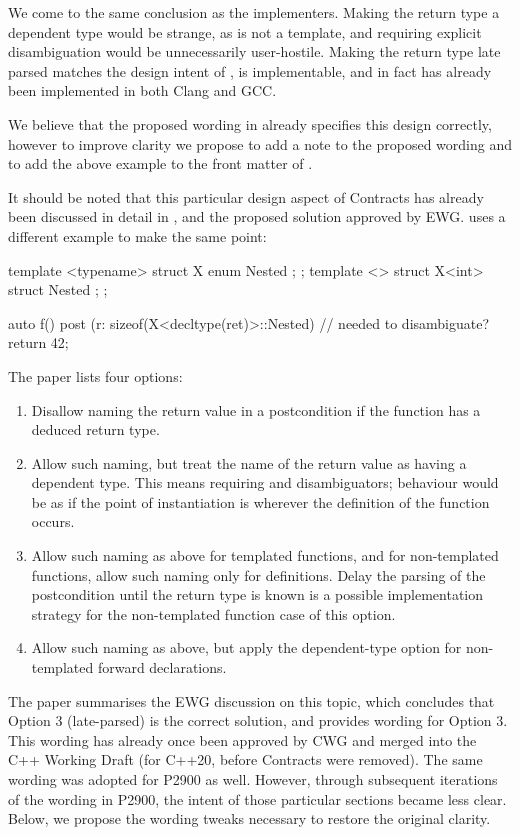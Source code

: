 We come to the same conclusion as the implementers. Making the return type a dependent type would be strange, as  is not a template, and requiring explicit disambiguation would be unnecessarily user-hostile. Making the return type late parsed matches the design intent of \cite{P2900R10}, is implementable, and in fact has already been implemented in both Clang and GCC.

We believe that the proposed wording in \cite{P2900R10} already specifies this design correctly, however to improve clarity we propose to add a note to the proposed wording and to add the above example to the front matter of \cite{P2900R10}.

It should be noted that this particular design aspect of Contracts has already been discussed in detail in \cite{P1323R2}, and the proposed solution approved by EWG. \cite{P1323R2} uses a different example to make the same point:
\begin{codeblock}
template <typename> struct X { enum { Nested }; };
template <> struct X<int>    { struct Nested {}; };

auto f()
post (r: sizeof(X<decltype(ret)>::Nested) {  //  needed to disambiguate?
  return 42;
}
\end{codeblock}
The paper lists four options:
\begin{enumerate}
\item Disallow naming the return value in a postcondition if the function has a deduced return type.
\item Allow such naming, but treat the name of the return value as having a dependent type. This means requiring  and  disambiguators; behaviour would be as if the point of instantiation is wherever the definition of the function occurs.
\item Allow such naming as above for templated functions, and for non-templated functions, allow such naming only for definitions. Delay the parsing of the postcondition until the return type is known is a possible implementation strategy for the non-templated function case of this option.
\item Allow such naming as above, but apply the dependent-type option for non-templated forward declarations.
\end{enumerate}
The paper summarises the EWG discussion on this topic, which concludes that Option 3 (late-parsed) is the correct solution, and provides wording for Option 3. This wording has already once been approved by CWG and merged into the C++ Working Draft (for C++20, before Contracts were removed). The same wording was adopted for P2900 as well. However, through subsequent iterations of the wording in P2900, the intent of those particular sections became less clear. Below, we propose the  wording tweaks necessary to restore the original clarity.


